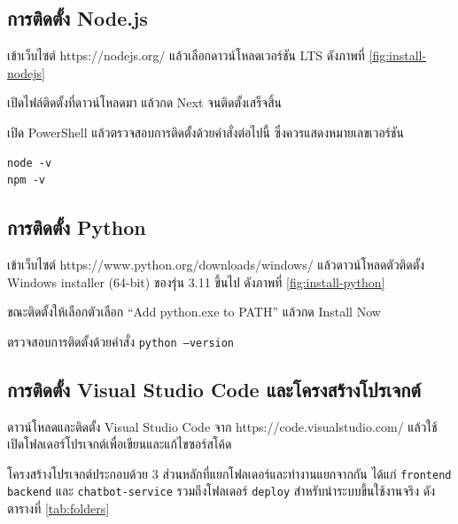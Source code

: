 \subsection{การติดตั้ง Node.js}

\begin{numlist}
\item เข้าเว็บไซต์ https://nodejs.org/ แล้วเลือกดาวน์โหลดเวอร์ชัน LTS ดังภาพที่ \ref{fig:install-nodejs}
\item เปิดไฟล์ติดตั้งที่ดาวน์โหลดมา แล้วกด Next จนติดตั้งเสร็จสิ้น
\item เปิด PowerShell แล้วตรวจสอบการติดตั้งด้วยคำสั่งต่อไปนี้ ซึ่งควรแสดงหมายเลขเวอร์ชัน
\end{numlist}


\begin{codeblock}
\begin{lstlisting}[numbers=none]
node -v
npm -v
\end{lstlisting}
\end{codeblock}

\subsection{การติดตั้ง Python}

\begin{numlist}
\item เข้าเว็บไซต์ https://www.python.org/downloads/windows/ แล้วดาวน์โหลดตัวติดตั้ง Windows installer (64-bit) ของรุ่น 3.11 ขึ้นไป ดังภาพที่ \ref{fig:install-python}
\item ขณะติดตั้งให้เลือกตัวเลือก ``Add python.exe to PATH'' แล้วกด Install Now
\item ตรวจสอบการติดตั้งด้วยคำสั่ง \texttt{python --version}
\end{numlist}


\clearpage
\subsection{การติดตั้ง Visual Studio Code และโครงสร้างโปรเจกต์}

ดาวน์โหลดและติดตั้ง Visual Studio Code จาก https://code.visualstudio.com/ แล้วใช้เปิดโฟลเดอร์โปรเจกต์เพื่อเขียนและแก้ไขซอร์สโค้ด

โครงสร้างโปรเจกต์ประกอบด้วย 3 ส่วนหลักที่แยกโฟลเดอร์และทำงานแยกจากกัน ได้แก่ \texttt{frontend} \texttt{backend} และ \texttt{chatbot-service} รวมถึงโฟลเดอร์ \texttt{deploy} สำหรับนำระบบขึ้นใช้งานจริง ดังตารางที่ \ref{tab:folders}

